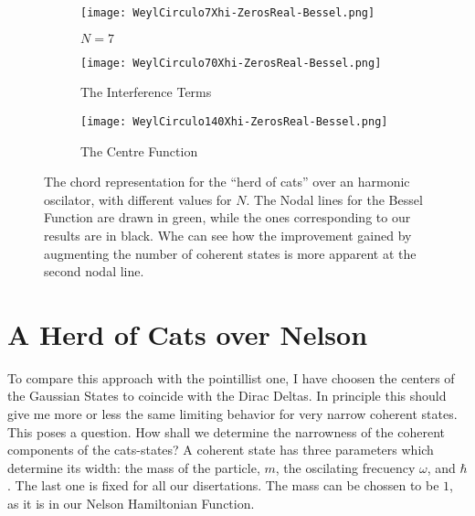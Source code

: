 \documentclass[a4paper,12pt]{article}
\begin{document}
\begin{figure}[H]
  \centering
  \begin{subfigure}[b]{0.33\textwidth}
    \centering
          \texttt{[image: WeylCirculo7Xhi-ZerosReal-Bessel.png]}
                \caption{$N=7$}
                \label{besselzero7}
  \end{subfigure}%
\begin{subfigure}[b]{0.33\textwidth}
    \centering
          \texttt{[image: WeylCirculo70Xhi-ZerosReal-Bessel.png]}
                \caption{The Interference Terms}
                \label{$N=70$}
  \end{subfigure}
  \begin{subfigure}[b]{0.33\textwidth}
    \centering
          \texttt{[image: WeylCirculo140Xhi-ZerosReal-Bessel.png]}
                \caption{The Centre Function}
                \label{$N=140$}
  \end{subfigure}%
\caption{ The chord representation for the ``herd of cats'' over an harmonic
oscilator, with different values for $N$. The Nodal lines for the
Bessel Function are drawn in green, while the ones corresponding to our
results are in black. Whe can see how the improvement gained by augmenting the number
of coherent states is more apparent at the second nodal line. 
 }\label{BesselZeros01}
\end{figure}

\section{A Herd of Cats over Nelson}

To compare this approach with the pointillist one, I have choosen the centers
of the Gaussian States to coincide with the Dirac Deltas. 
In principle this should give me more or less the same limiting behavior for 
very narrow coherent states.  This poses a question. 
How shall we determine the narrowness of the coherent components of the cats-states? 
A coherent state has three parameters which determine its width:
the mass of the particle, $m$, the oscilating frecuency $\omega$, and $\hbar$. 
The last one is fixed for all our disertations. 
The mass can be chossen to be $1$, as it is in our Nelson Hamiltonian Function.






\end{document}
